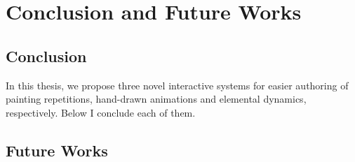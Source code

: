 \chapter{Conclusion and Future Works}
\label{sec:conclusion}

\section{Conclusion}
In this thesis, we propose three novel interactive systems for easier authoring of painting repetitions, hand-drawn animations and elemental dynamics, respectively. Below I conclude each of them.


\section{Future Works}
\label{sec:future_work_final}






